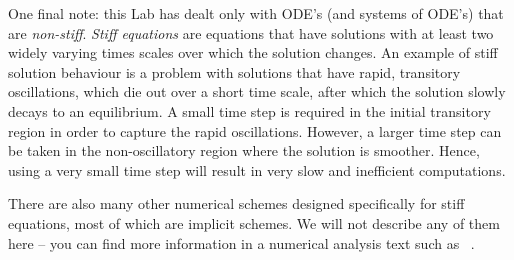 One final note: this Lab has dealt only with ODE's (and systems of
ODE's) that are \emph{ non-stiff}.  \emph{ Stiff equations} are equations
that have solutions with at least two widely varying times scales over
which the solution 
changes.  An example of stiff solution behaviour is a problem with
solutions that have rapid, 
transitory oscillations, which die out over a short time scale, after
which the solution slowly decays to an equilibrium.  A small time step
is required in the initial transitory region in order to capture the
rapid oscillations.  However, a larger time step can be taken in the
non-oscillatory region where the solution is smoother.  Hence, using a
very small time step will result in very slow and inefficient
computations.  

There are also many other numerical schemes designed
specifically for stiff equations, most of which are implicit schemes.
We will not describe any of them 
here -- you can find more information in a numerical analysis text
such as ~\cite{burden-faires}.  

\begin{latexonly}
\end{latexonly}

